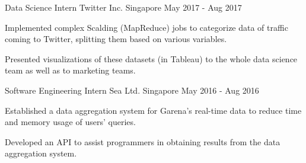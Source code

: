\begin{cventries}
  \cventry
  {Data Science Intern} %
  {Twitter Inc.} %
  {Singapore} %
  {May 2017 - Aug 2017} %
  {
    \begin{cvitems} %
    \item {Implemented complex Scalding (MapReduce) jobs to categorize data of traffic coming to Twitter, splitting them based on various variables.}
    \item {Presented visualizations of these datasets (in Tableau) to the whole data science team as well as to marketing teams.}
    \end{cvitems}
  }

  \cventry
  {Software Engineering Intern} %
  {Sea Ltd.} %
  {Singapore} %
  {May 2016 - Aug 2016} %
  {
    \begin{cvitems} %
    \item {Established a data aggregation system for Garena's real-time data to reduce time and memory usage of users' queries.}
    \item {Developed an API to assist programmers in obtaining results from the data aggregation system.}
    \end{cvitems}
  }

\end{cventries}

